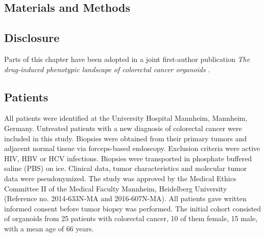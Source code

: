 \begin{flushleft}

\chapter{Materials and Methods}

\section{Disclosure}
Parts of this chapter have been adopted in a joint first-author publication \textit{The drug-induced phenotypic landscape of colorectal cancer organoids} \parencite{betgeDruginducedPhenotypicLandscape2022}.  

\section{Patients}
All patients were identified at the University Hospital Mannheim, Mannheim, Germany. Untreated patients with a new diagnosis of colorectal cancer were included in this study. Biopsies were obtained from their primary tumors and adjacent normal tissue via forceps-based endoscopy. Exclusion criteria were active HIV, HBV or HCV infections. Biopsies were transported in phosphate buffered saline (PBS) on ice. Clinical data, tumor characteristics and molecular tumor data were pseudonymized. The study was approved by the Medical Ethics Committee II of the Medical Faculty Mannheim, Heidelberg University (Reference no. 2014-633N-MA and 2016-607N-MA). All patients gave written informed consent before tumor biopsy was performed. The initial cohort consisted of organoids from 25 patients with colorectal cancer, 10 of them female, 15 male, with a mean age of 66 years.


\end{flushleft}
